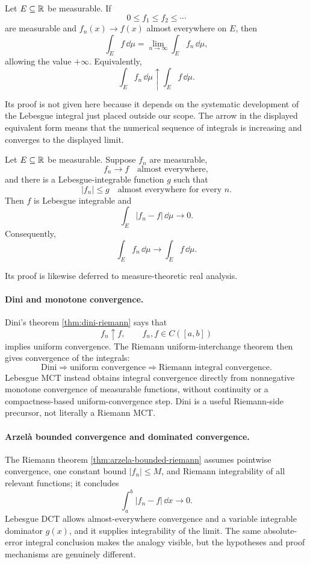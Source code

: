 \begin{theorem}
\label{thm:lebesgue-mct-preview}
Let \(E\subseteq\mathbb{R}\) be measurable. If
\[
0\leq f_1\leq f_2\leq\cdots
\]
are measurable and \(f_n(x)\to f(x)\) almost everywhere on \(E\), then
\[
\boxed{\int_E f\,\dd\mu
=\lim_{n\to\infty}\int_E f_n\,\dd\mu,}
\]
allowing the value \(+\infty\). Equivalently,
\[
\int_E f_n\,\dd\mu\uparrow\int_E f\,\dd\mu.
\]
\end{theorem}
Its proof is not given here because it depends on the systematic
development of the Lebesgue integral just placed outside our scope.
The arrow in the displayed equivalent form means that the numerical sequence
of integrals is increasing and converges to the displayed limit.

\begin{theorem}
\label{thm:lebesgue-dct-preview}
Let \(E\subseteq\mathbb{R}\) be measurable. Suppose \(f_n\) are measurable,
\[
f_n\to f\quad\text{almost everywhere},
\]
and there is a Lebesgue-integrable function \(g\) such that
\[
|f_n|\leq g
\quad\text{almost everywhere for every }n.
\]
Then \(f\) is Lebesgue integrable and
\[
\boxed{\int_E|f_n-f|\,\dd\mu\longrightarrow0.}
\]
Consequently,
\[
\boxed{\int_E f_n\,\dd\mu\longrightarrow\int_E f\,\dd\mu.}
\]
\end{theorem}
Its proof is likewise deferred to measure-theoretic real analysis.

\paragraph{Dini and monotone convergence.}
Dini's theorem \cref{thm:dini-riemann} says that
\[
f_n\uparrow f,\qquad f_n,f\in C([a,b])
\]
implies uniform convergence. The Riemann uniform-interchange theorem then
gives convergence of the integrals:
\[
\text{Dini}\Longrightarrow\text{uniform convergence}
\Longrightarrow\text{Riemann integral convergence}.
\]
Lebesgue MCT instead obtains integral convergence directly from
nonnegative monotone convergence of measurable functions, without
continuity or a compactness-based uniform-convergence step. Dini is a useful
Riemann-side precursor, not literally a Riemann MCT.

\paragraph{Arzel\`a bounded convergence and dominated convergence.}
The Riemann theorem \cref{thm:arzela-bounded-riemann} assumes pointwise
convergence, one constant bound \(|f_n|\leq M\), and Riemann integrability
of all relevant functions; it concludes
\[
\int_a^b|f_n-f|\,\dd x\to0.
\]
Lebesgue DCT allows almost-everywhere convergence and a variable integrable
dominator \(g(x)\), and it supplies integrability of the limit. The same
absolute-error integral conclusion makes the analogy visible, but the hypotheses and
proof mechanisms are genuinely different.

